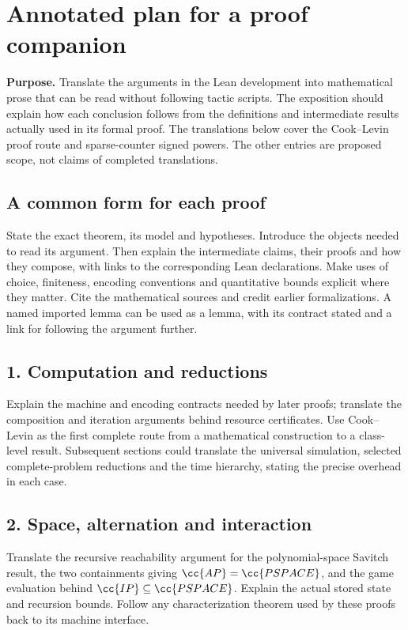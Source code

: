 \section*{Annotated plan for a proof companion}

\textbf{Purpose.}
Translate the arguments in the Lean development into mathematical prose that can be
read without following tactic scripts. The exposition should explain how each conclusion
follows from the definitions and intermediate results actually used in its formal proof.
The translations below cover the Cook--Levin proof route and sparse-counter signed
powers. The other entries are proposed scope, not claims of completed translations.

\subsection*{A common form for each proof}
State the exact theorem, its model and hypotheses. Introduce the objects needed to read
its argument. Then explain the intermediate claims, their proofs and how they compose,
with links to the corresponding Lean declarations. Make uses of choice, finiteness,
encoding conventions and quantitative bounds explicit where they matter. Cite the
mathematical sources and credit earlier formalizations. A named imported lemma can be
used as a lemma, with its contract stated and a link for following the argument further.

\subsection*{1. Computation and reductions}
Explain the machine and encoding contracts needed by later proofs; translate the
composition and iteration arguments behind resource certificates. Use Cook--Levin as
the first complete route from a mathematical construction to a class-level result.
Subsequent sections could translate the universal simulation, selected complete-problem
reductions and the time hierarchy, stating the precise overhead in each case.

\subsection*{2. Space, alternation and interaction}
Translate the recursive reachability argument for the polynomial-space Savitch result,
the two containments giving $\cc{AP}=\cc{PSPACE}$, and the game evaluation behind
$\cc{IP}\subseteq\cc{PSPACE}$. Explain the actual stored state and recursion bounds.
Follow any characterization theorem used by these proofs back to its machine interface.

